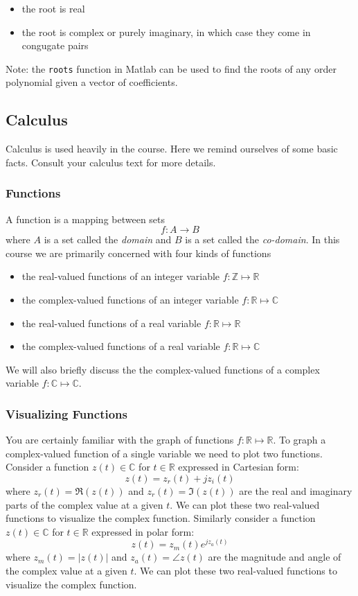 \begin{itemize}
\item the root is real
\item the root is complex or purely imaginary, in which case they come in congugate pairs 
\end{itemize}

Note: the \texttt{roots} function in Matlab can be used to find the roots of any order polynomial given a vector of coefficients.

\subsection{Calculus}

Calculus is used heavily in the course. Here we remind ourselves of some basic facts. Consult your calculus text for more details.

\subsubsection*{Functions}

A function is a mapping between sets
\[
f: A \rightarrow B
\]
where $A$ is a set called the {\it domain} and $B$ is a set called the {\it co-domain}. In this course we are primarily concerned with four kinds of functions

\begin{itemize}
\item the real-valued functions of an integer variable $f:\mathbb{Z}\mapsto\mathbb{R}$
\item the complex-valued functions of an integer variable $f:\mathbb{R}\mapsto\mathbb{C}$
\item the real-valued functions of a real variable $f:\mathbb{R}\mapsto\mathbb{R}$
\item the complex-valued functions of a real variable $f:\mathbb{R}\mapsto\mathbb{C}$
\end{itemize}
We will also briefly discuss the the complex-valued functions of a complex variable $f:\mathbb{C}\mapsto\mathbb{C}$.

\subsubsection*{Visualizing Functions}

You are certainly familiar with the graph of functions $f:\mathbb{R}\mapsto\mathbb{R}$. To graph a complex-valued function of a single variable we need to plot two functions. Consider a function $z(t) \in \mathbb{C}$ for $t \in \mathbb{R}$ expressed in Cartesian form:
\[
z(t) = z_r(t) + j z_i(t) 
\]
where $z_r(t) = \Re(z(t))$ and $z_r(t) = \Im(z(t))$ are the real and imaginary parts of the complex value at a given $t$. We can plot these two real-valued functions to visualize the complex function. Similarly consider a function $z(t) \in \mathbb{C}$ for $t \in \mathbb{R}$ expressed in polar form:
\[
z(t) = z_m(t) e^{jz_a(t)}
\]
where $z_m(t) = |z(t)|$ and $z_a(t) = \angle z(t)$ are the magnitude and angle of the complex value at a given $t$. We can plot these two real-valued functions to visualize the complex function.

